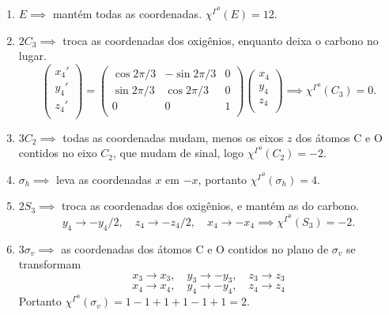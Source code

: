 \documentclass[a4paper,10pt]{article}
\newcommand{\mchi}{\chi^{\Gamma^0}}
\begin{document}
\begin{enumerate}
\item $E \implies$ mantém todas as coordenadas. $\chi^{\Gamma^0}(E) = 12$.
\item $2 C_3 \implies$ troca as coordenadas dos oxigênios, enquanto deixa o carbono no lugar.
$$
\begin{pmatrix}
x_4' \\
y_4' \\
z_4' \\
\end{pmatrix}
=
\begin{pmatrix}
\cos2\pi/3 & -\sin2\pi/3 & 0 \\
\sin2\pi/3 &  \cos2\pi/3 & 0 \\
0 & 0 & 1 \\
\end{pmatrix}
\begin{pmatrix}
x_4 \\
y_4 \\
z_4 \\
\end{pmatrix}
\implies \chi^{\Gamma^0}(C_3) = 0.
$$
\item $3 C_2 \implies$ todas as coordenadas mudam, menos os eixos $z$ dos átomos C e O contidos no eixo $C_2$, que mudam de sinal, logo $\chi^{\Gamma^0}(C_2) = -2$.
\item $\sigma_h \implies$ leva as coordenadas $x$ em $-x$, portanto $\chi^{\Gamma^0}(\sigma_h) = 4$.
\item $2 S_3 \implies$ troca as coordenadas dos oxigênios, e mantém as do carbono.
$$
y_4 \to -y_4/2, \quad z_4 \to -z_4/2, \quad x_4 \to -x_4 \implies \mchi(S_3) = -2.
$$
\item $3 \sigma_v \implies$ as coordenadas dos átomos C e O contidos no plano de $\sigma_v$ se transformam
$$
x_3 \to x_3, \quad y_3 \to -y_3, \quad z_3 \to z_3
$$
$$
x_4 \to x_4, \quad y_4 \to -y_4, \quad z_4 \to z_4
$$
Portanto $\mchi(\sigma_v) = 1 - 1 + 1 + 1 - 1 + 1  = 2$.
\end{enumerate}
\end{document}
